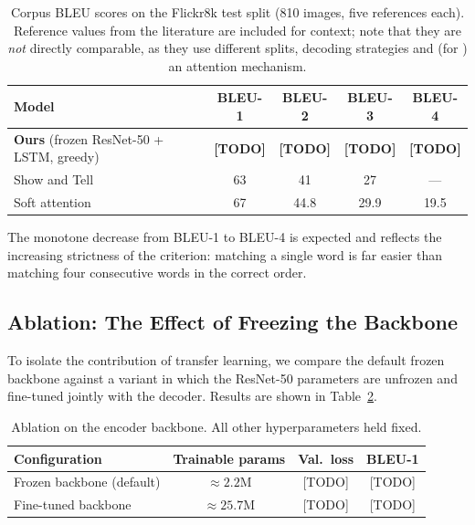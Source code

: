 \documentclass{article}
\begin{document}
\begin{table}[h]
  \caption{Corpus BLEU scores on the Flickr8k test split (810 images, five
           references each). Reference values from the literature are included
           for context; note that they are \emph{not} directly comparable, as
           they use different splits, decoding strategies and (for
           \citet{xu2015show}) an attention mechanism.}
  \label{tab:bleu}
  \centering
  \begin{tabular}{lcccc}
    \toprule
    Model & BLEU-1 & BLEU-2 & BLEU-3 & BLEU-4 \\
    \midrule
    \textbf{Ours} (frozen ResNet-50 + LSTM, greedy) & \textbf{[TODO]} & \textbf{[TODO]} & \textbf{[TODO]} & \textbf{[TODO]} \\
    \midrule
    Show and Tell \citep{vinyals2015show}      & 63 & 41 & 27 & --- \\
    Soft attention \citep{xu2015show}          & 67 & 44.8 & 29.9 & 19.5 \\
    \bottomrule
  \end{tabular}
\end{table}

The monotone decrease from BLEU-1 to BLEU-4 is expected and reflects the
increasing strictness of the criterion: matching a single word is far easier than
matching four consecutive words in the correct order.

\subsection{Ablation: The Effect of Freezing the Backbone}


To isolate the contribution of transfer learning, we compare the default frozen
backbone against a variant in which the ResNet-50 parameters are unfrozen and
fine-tuned jointly with the decoder. Results are shown in
Table~\ref{tab:ablation}.

\begin{table}[h]
  \caption{Ablation on the encoder backbone. All other hyperparameters held
           fixed.}
  \label{tab:ablation}
  \centering
  \begin{tabular}{lccc}
    \toprule
    Configuration & Trainable params & Val.\ loss & BLEU-1 \\
    \midrule
    Frozen backbone (default) & $\approx 2.2$M  & [TODO] & [TODO] \\
    Fine-tuned backbone       & $\approx 25.7$M & [TODO] & [TODO] \\
    \bottomrule
  \end{tabular}
\end{table}
\end{document}
